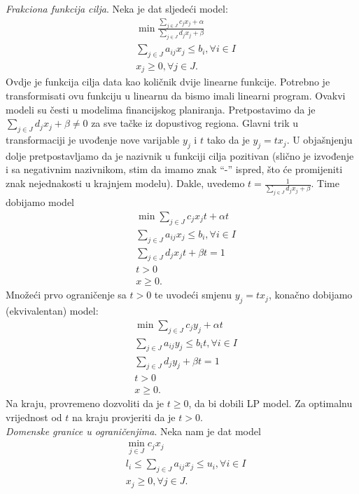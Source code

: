\documentclass[a4paper, utf8, 11pt, colorlinks]{book}
\begin{document}
\emph{Frakciona funkcija cilja}. Neka je dat sljedeći model:
\begin{align*}
	& \min \frac{\sum_{j \in J} c_j x_j + \alpha}{ \sum_{j \in J} d_j x_j + \beta} \\
	& \sum_{j \in J} a_{ij} x_j \leq b_i,  \forall i \in I \\
	& x_j \geq 0, \forall j \in J.
\end{align*}
Ovdje je funkcija cilja data kao količnik dvije linearne funkcije. Potrebno je transformisati ovu funkciju u linearnu da bismo imali linearni program. Ovakvi modeli su česti u modelima financijskog planiranja. Pretpostavimo da je $\sum_{j \in J}d_j x_j + \beta \neq 0$ za sve tačke iz dopustivog regiona. Glavni trik u transformaciji je uvođenje nove varijable $y_j$ i $t$ tako da je $y_j = t x_j$. U objašnjenju dolje pretpostavljamo da je nazivnik u funkciji cilja pozitivan (slično je izvođenje i sa negativnim nazivnikom, stim da imamo znak ``-'' ispred, što će promijeniti znak nejednakosti u krajnjem modelu). Dakle, uvedemo $t = \frac{1}{\sum_{j \in J} d_j x_j + \beta }$. Time dobijamo model
\begin{align*}
	&\min \sum_{j \in J} c_j x_j t + \alpha t \\
	&\sum_{j \in J} a_{ij} x_j \leq b_i,  \forall i \in I \\
	& \sum_{j \in J} d_j x_j t + \beta t = 1 \\
	& t > 0 \\
	& x \geq 0.
\end{align*}
Množeći prvo ograničenje sa $t>0$ te uvodeći smjenu $y_j = t x_j$, konačno dobijamo (ekvivalentan)  model:
\begin{align*}
	&\min \sum_{j \in J} c_j y_j + \alpha t \\
	& \sum_{j \in J} a_{ij} y_j \leq b_i t,  \forall i \in I \\
	& \sum_{j \in J} d_j y_j + \beta t = 1 \\
	& t > 0 \\
	& x \geq 0.
\end{align*}
Na kraju, provremeno dozvoliti da je $t \geq 0$, da bi dobili LP model. 
Za optimalnu vrijednost od $t$ na kraju provjeriti da je $t>0$.   \\
\emph{Domenske granice u ograničenjima}. Neka nam je dat model
\begin{align*}
	&\min_{j \in J } c_j x_j \\
	& l_i \leq \sum_{j \in J} a_{ij} x_j \leq u_i, \forall i\in I \\
	& x_j \geq 0, \forall j \in J.
\end{align*} 
\end{document}
